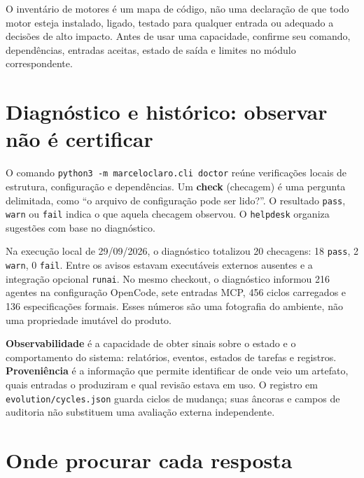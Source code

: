 \begin{limite}
O inventário de motores é um mapa de código, não uma declaração de que todo
motor esteja instalado, ligado, testado para qualquer entrada ou adequado a
decisões de alto impacto. Antes de usar uma capacidade, confirme seu comando,
dependências, entradas aceitas, estado de saída e limites no módulo
correspondente.
\end{limite}

\section{Diagnóstico e histórico: observar não é certificar}

\begin{descricao}
O comando \texttt{python3 -m marceloclaro.cli doctor} reúne verificações locais
de estrutura, configuração e dependências. Um \textbf{check} (checagem) é uma
pergunta delimitada, como ``o arquivo de configuração pode ser lido?''. O
resultado \texttt{pass}, \texttt{warn} ou \texttt{fail} indica o que aquela
checagem observou. O \texttt{helpdesk} organiza sugestões com base no
diagnóstico.
\end{descricao}

\begin{resultado}
Na execução local de 29/09/2026, o diagnóstico totalizou 20 checagens: 18
\texttt{pass}, 2 \texttt{warn}, 0 \texttt{fail}. Entre os avisos estavam
executáveis externos ausentes e a integração opcional \texttt{runai}. No mesmo
checkout, o diagnóstico informou 216 agentes na configuração OpenCode, sete
entradas MCP, 456 ciclos carregados e 136 especificações formais. Esses números
são uma fotografia do ambiente, não uma propriedade imutável do produto.
\end{resultado}

\begin{conceito}
\textbf{Observabilidade} é a capacidade de obter sinais sobre o estado e o
comportamento do sistema: relatórios, eventos, estados de tarefas e registros.
\textbf{Proveniência} é a informação que permite identificar de onde veio um
artefato, quais entradas o produziram e qual revisão estava em uso. O registro
em \texttt{evolution/cycles.json} guarda ciclos de mudança; suas âncoras e
campos de auditoria não substituem uma avaliação externa independente.
\end{conceito}

\section{Onde procurar cada resposta}

